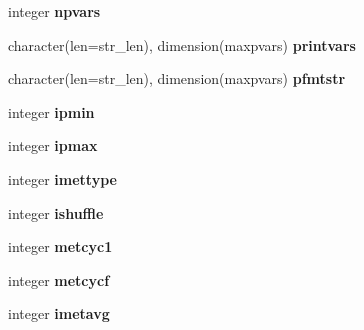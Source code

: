 \begin{DoxyCompactItemize}
\item 
\hypertarget{structename__coms_1_1ename__vars_a062ee82d7e7fb82721a1be11a9c572f3}{
integer {\bfseries npvars}}
\label{structename__coms_1_1ename__vars_a062ee82d7e7fb82721a1be11a9c572f3}

\item 
\hypertarget{structename__coms_1_1ename__vars_af02e5325ae6e189564c610b68e5ff5f3}{
character(len=str\_\-len), dimension(maxpvars) {\bfseries printvars}}
\label{structename__coms_1_1ename__vars_af02e5325ae6e189564c610b68e5ff5f3}

\item 
\hypertarget{structename__coms_1_1ename__vars_a155e2d245c8c53af7718aad9e3de8415}{
character(len=str\_\-len), dimension(maxpvars) {\bfseries pfmtstr}}
\label{structename__coms_1_1ename__vars_a155e2d245c8c53af7718aad9e3de8415}

\item 
\hypertarget{structename__coms_1_1ename__vars_addfc503eff7fcf2bc1ef284085010a32}{
integer {\bfseries ipmin}}
\label{structename__coms_1_1ename__vars_addfc503eff7fcf2bc1ef284085010a32}

\item 
\hypertarget{structename__coms_1_1ename__vars_a930c2b966704a455b099c6a3fb969827}{
integer {\bfseries ipmax}}
\label{structename__coms_1_1ename__vars_a930c2b966704a455b099c6a3fb969827}

\item 
\hypertarget{structename__coms_1_1ename__vars_a9bde2e318f0115de72aff2bf59d67621}{
integer {\bfseries imettype}}
\label{structename__coms_1_1ename__vars_a9bde2e318f0115de72aff2bf59d67621}

\item 
\hypertarget{structename__coms_1_1ename__vars_a3ec1970fe6cd75be8ad23ae87ca669b7}{
integer {\bfseries ishuffle}}
\label{structename__coms_1_1ename__vars_a3ec1970fe6cd75be8ad23ae87ca669b7}

\item 
\hypertarget{structename__coms_1_1ename__vars_ac0b6769415708da8c61e4e365b2c8209}{
integer {\bfseries metcyc1}}
\label{structename__coms_1_1ename__vars_ac0b6769415708da8c61e4e365b2c8209}

\item 
\hypertarget{structename__coms_1_1ename__vars_a03cab977c22736e0ed58fa340e228844}{
integer {\bfseries metcycf}}
\label{structename__coms_1_1ename__vars_a03cab977c22736e0ed58fa340e228844}

\item 
\hypertarget{structename__coms_1_1ename__vars_a91b36cf7375007bf0351e2301c23756d}{
integer {\bfseries imetavg}}
\label{structename__coms_1_1ename__vars_a91b36cf7375007bf0351e2301c23756d}


\end{DoxyCompactItemize}

